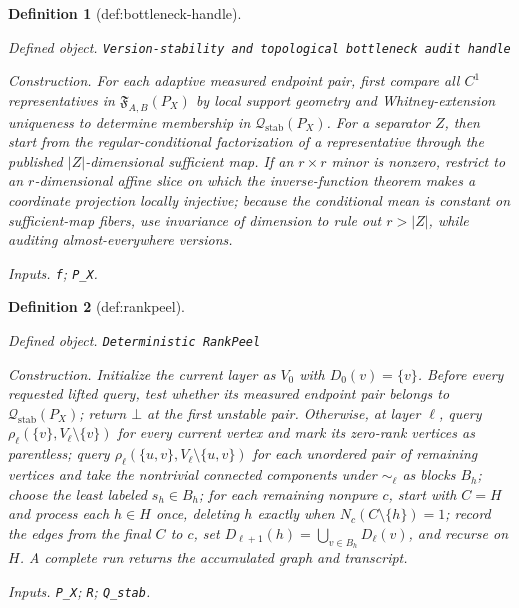 \documentclass{article}
\newtheorem{definition}{Definition}
\begin{document}
\begin{definition}[def:bottleneck-handle]\label{def:bottleneck-handle}
\par\smallskip\noindent\emph{Defined object.} \texttt{Version-\allowbreak{}stability and topological bottleneck audit handle}
\par\smallskip\noindent\emph{Construction.} For each adaptive measured endpoint pair, first compare all \(C^1\) representatives in \(\mathfrak F_{A,B}(P_X)\) by local support geometry and Whitney-extension uniqueness to determine membership in \(\mathcal Q_{\mathrm{stab}}(P_X)\). For a separator \(Z\), then start from the regular-conditional factorization of a representative through the published \(|Z|\)-dimensional sufficient map. If an \(r\times r\) minor is nonzero, restrict to an \(r\)-dimensional affine slice on which the inverse-function theorem makes a coordinate projection locally injective; because the conditional mean is constant on sufficient-map fibers, use invariance of dimension to rule out \(r>|Z|\), while auditing almost-everywhere versions.
\par\smallskip\noindent\emph{Inputs.} \texttt{f}; \texttt{P\_\allowbreak{}X}.
\end{definition}

\begin{definition}[def:rankpeel]\label{def:rankpeel}
\par\smallskip\noindent\emph{Defined object.} \texttt{Deterministic RankPeel}
\par\smallskip\noindent\emph{Construction.} Initialize the current layer as \(V_0\) with \(D_0(v)=\{v\}\). Before every requested lifted query, test whether its measured endpoint pair belongs to \(\mathcal Q_{\mathrm{stab}}(P_X)\); return \(\bot\) at the first unstable pair. Otherwise, at layer \(\ell\), query \(\rho_\ell(\{v\},V_\ell\setminus\{v\})\) for every current vertex and mark its zero-rank vertices as parentless; query \(\rho_\ell(\{u,v\},V_\ell\setminus\{u,v\})\) for each unordered pair of remaining vertices and take the nontrivial connected components under \(\sim_\ell\) as blocks \(B_h\); choose the least labeled \(s_h\in B_h\); for each remaining nonpure \(c\), start with \(C=H\) and process each \(h\in H\) once, deleting \(h\) exactly when \(N_c(C\setminus\{h\})=1\); record the edges from the final \(C\) to \(c\), set \(D_{\ell+1}(h)=\bigcup_{v\in B_h}D_\ell(v)\), and recurse on \(H\). A complete run returns the accumulated graph and transcript.
\par\smallskip\noindent\emph{Inputs.} \texttt{P\_\allowbreak{}X}; \texttt{R}; \texttt{Q\_\allowbreak{}stab}.
\end{definition}
\end{document}

